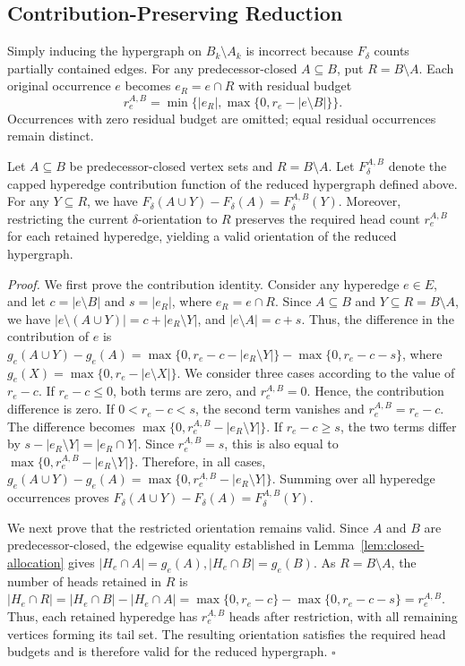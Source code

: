\documentclass[twocolumn]{svjour3}
\begin{document}
\subsection{Contribution-Preserving Reduction}
Simply inducing the hypergraph on $B_k\setminus A_k$ is incorrect because $F_\delta$ counts partially contained edges. For any predecessor-closed $A\subseteq B$, put $R=B\setminus A$. Each original occurrence $e$ becomes $e_R=e\cap R$ with residual budget
\begin{equation*}
 r_e^{A,B}=\min\{|e_R|,\max\{0,r_e-|e\setminus B|\}\}.
\end{equation*}
Occurrences with zero residual budget are omitted; equal residual occurrences remain distinct.

\begin{theorem}
\label{thm:residual-objective}
Let $A\subseteq B$ be predecessor-closed vertex sets and $R=B\setminus A$. Let $F^{A,B}_\delta$ denote the capped hyperedge contribution function of the reduced hypergraph defined above. For any $Y\subseteq R$, we have
$F_\delta(A\cup Y)-F_\delta(A)=F^{A,B}_\delta(Y)$.
Moreover, restricting the current $\delta$-orientation to $R$ preserves the required head count $r_e^{A,B}$ for each retained hyperedge, yielding a valid orientation of the reduced hypergraph.
\end{theorem}
\emph{Proof.}
We first prove the contribution identity. Consider any hyperedge $e\in E$, and let $c=|e\setminus B|$ and $s=|e_R|$, where $e_R=e\cap R$. Since $A\subseteq B$ and $Y\subseteq R=B\setminus A$, we have $|e\setminus(A\cup Y)|=c+|e_R\setminus Y|$,
and $|e\setminus A|=c+s$. Thus, the difference in the contribution of $e$ is
$g_e(A\cup Y)-g_e(A) =\max\{0,r_e-c-|e_R\setminus Y|\} -\max\{0,r_e-c-s\}$,
where $g_e(X)=\max\{0,r_e-|e\setminus X|\}$.
We consider three cases according to the value of $r_e-c$.
If $r_e-c\le 0$, both terms are zero, and $r_e^{A,B}=0$. Hence, the contribution difference is zero.
If $0<r_e-c<s$, the second term vanishes and $r_e^{A,B}=r_e-c$. The difference becomes
$\max\{0,r_e^{A,B}-|e_R\setminus Y|\}$.
If $r_e-c\ge s$, the two terms differ by
$s-|e_R\setminus Y|=|e_R\cap Y|$. Since $r_e^{A,B}=s$, this is also equal to
$\max\{0,r_e^{A,B}-|e_R\setminus Y|\}$.
Therefore, in all cases,
$g_e(A\cup Y)-g_e(A)
=\max\{0,r_e^{A,B}-|e_R\setminus Y|\}$.
Summing over all hyperedge occurrences proves
$F_\delta(A\cup Y)-F_\delta(A)
=F_\delta^{A,B}(Y)$.

We next prove that the restricted orientation remains valid. Since $A$ and $B$ are predecessor-closed, the edgewise equality established in Lemma~\ref{lem:closed-allocation} gives
$|H_e\cap A|=g_e(A),
|H_e\cap B|=g_e(B)$.
As $R=B\setminus A$, the number of heads retained in $R$ is
$|H_e\cap R|=|H_e\cap B|-|H_e\cap A|=\max\{0,r_e-c\} -\max\{0,r_e-c-s\}=r_e^{A,B}$.
Thus, each retained hyperedge has $r_e^{A,B}$ heads after restriction, with all remaining vertices forming its tail set. The resulting orientation satisfies the required head budgets and is therefore valid for the reduced hypergraph.
\hfill$\square$
\end{document}

